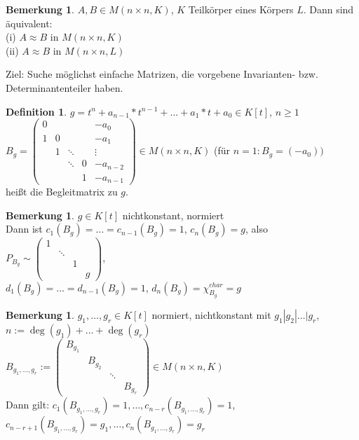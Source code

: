 \documentclass[10pt,a4paper,numbers=endperiod]{scrartcl}
\theoremstyle{definition}
\newtheorem{defi}[satz]{Definition}
\newtheorem{bem}[satz]{Bemerkung}
\begin{document}
\begin{bem}
	$A, B \in M(n \times n, K)$, $K$ Teilkörper eines Körpers $L$. Dann sind äquivalent:\\
	(i) $A \approx B$ in $M(n \times n, K)$\\
	(ii) $A \approx B$ in $M(n \times n, L)$
\end{bem}

Ziel: Suche möglichst einfache Matrizen, die vorgebene Invarianten- bzw. Determinantenteiler haben.

\begin{defi}
	$g = t^n + a_{n-1}*t^{n-1} + \ldots + a_1*t + a_0 \in K[t]$, $n \geq 1$\\
	$B_g = \begin{pmatrix}
	0 & & & & -a_0\\
	1 & 0 & & & -a_1\\
	& 1 & \ddots & & \vdots\\
	& & \ddots & 0 & -a_{n-2}\\
	& & & 1 & -a_{n-1}
	\end{pmatrix} \in M(n \times n, K)$  (für $n = 1: B_g = (-a_0))$\\
	heißt die Begleitmatrix zu $g$.
\end{defi}
\newpage
\begin{bem}
	$g \in K[t]$ nichtkonstant, normiert\\
	Dann ist $c_1(B_g) = \ldots = c_{n-1}(B_g) = 1$, $c_n(B_g) = g$, also\\
	$P_{B_g} \sim \begin{pmatrix}
	1 & & &\\
	& \ddots & &\\
	& & 1 & \\
	& & & g
	\end{pmatrix}$,\\
	$d_1(B_g) = \ldots = d_{n-1}(B_g) = 1$, $d_n(B_g) = \chi_{B_g}^{char} = g$
\end{bem}

\begin{bem}
	$g_1, \ldots, g_r \in K[t]$ normiert, nichtkonstant mit $g_1|g_2|\ldots|g_r$,\\
	$n:= \deg(g_1) + \ldots + \deg(g_r)$\\
	$B_{g_1, \ldots, g_r} := \begin{pmatrix}
	B_{g_1} & & &\\
	& B_{g_2} & &\\
	& & \ddots &\\
	& & & B_{g_r}
	\end{pmatrix} \in M(n \times n,K)$\\
	Dann gilt: $c_1(B_{g_1, \ldots, g_r}) = 1, \ldots, c_{n-r}(B_{g_1, \ldots, g_r}) = 1$,\\
	$c_{n-r+1}(B_{g_1, \ldots, g_r}) = g_1, \ldots, c_n(B_{g_1, \ldots, g_r}) = g_r$
\end{bem}
\end{document}
